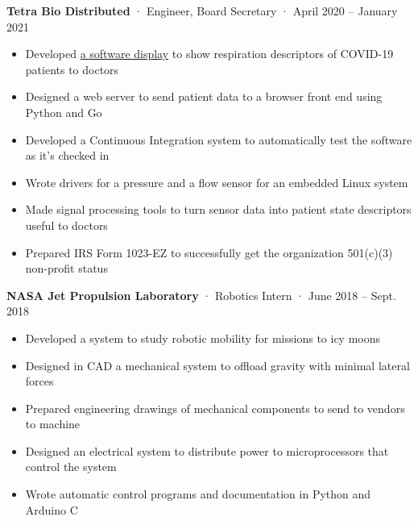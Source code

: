 \documentclass[12pt, oneside]{article}
\newcommand{\jobtitle}[3] {
	{\bf #1} · {#2} · {#3} \vspace{-7pt} \\
}
\begin{document}
\begin{flushleft}
\jobtitle{Tetra Bio Distributed}{Engineer, Board Secretary}{April 2020 – January 2021}
\begin{itemize}
	\item Developed \href{https://github.com/tetrabiodistributed/project-tetra-display}{a software display} to show respiration descriptors of COVID-19 patients to doctors \\
	\item Designed a web server to send patient data to a browser front end using Python and Go \\
	\item Developed a Continuous Integration system to automatically test the software as it's checked in \\
	\item Wrote drivers for a pressure and a flow sensor for an embedded Linux system \\
	\item Made signal processing tools to turn sensor data into patient state descriptors useful to doctors \\
	\item Prepared IRS Form 1023-EZ to successfully get the organization 501(c)(3) non-profit status \\
\end{itemize}

\jobtitle{NASA Jet Propulsion Laboratory}{Robotics Intern}{June 2018 – Sept. 2018}
\begin{itemize}
	\item Developed a system to study robotic mobility for missions to icy moons \\
	\item Designed in CAD a mechanical system to offload gravity with minimal lateral forces \\
	\item Prepared engineering drawings of mechanical components to send to vendors to machine \\
	\item Designed an electrical system to distribute power to microprocessors that control the system \\
	\item Wrote automatic control programs and documentation in Python and Arduino C \\
\end{itemize}


\end{flushleft}
\end{document}
